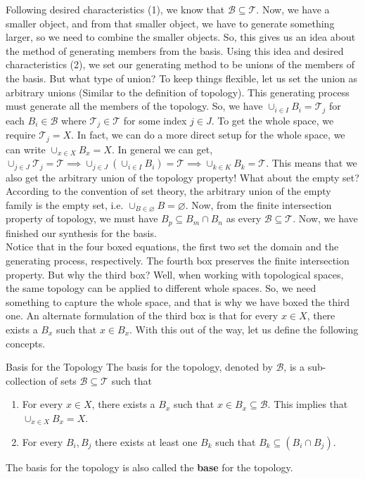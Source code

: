 Following desired characteristics (1), we know that $\boxed{\mathcal{B}\subseteq\mathcal{T}}$. Now, we have a smaller object, and from that smaller object, we have to generate something larger, so we need to combine the smaller objects. So, this gives us an idea about the method of generating members from the basis. Using this idea and desired characteristics (2), we set our generating method to be unions of the members of the basis. But what type of union? To keep things flexible, let us set the union as arbitrary unions (Similar to the definition of topology). This generating process must generate all the members of the topology. So, we have $\boxed{\cup_{i\in I}B_i=\mathcal{T}_j}$ for each $B_i\in\mathcal{B}$ where $\mathcal{T}_j\in\mathcal{T}$ for some index $j\in J$. To get the whole space, we require $\mathcal{T}_j=X$. In fact, we can do a more direct setup for the whole space, we can write $\boxed{\cup_{x\in X}B_x=X}$. In general we can get, $\cup_{j\in J}\mathcal{T}_j=\mathcal{T}\implies\cup_{j\in J}(\cup_{i\in I}B_i)=\mathcal{T}\implies\cup_{k\in K}B_k=\mathcal{T}$. This means that we also get the arbitrary union of the topology property! What about the empty set? According to the convention of set theory, the arbitrary union of the empty family is the empty set, i.e. $\cup_{B\in\varnothing}B=\varnothing$. Now, from the finite intersection property of topology, we must have $\boxed{B_p\subseteq B_m\cap B_n}$ as every $\mathcal{B}\subseteq\mathcal{T}$. Now, we have finished our synthesis for the basis.\\
Notice that in the four boxed equations, the first two set the domain and the generating process, respectively. The fourth box preserves the finite intersection property. But why the third box? Well, when working with topological spaces, the same topology can be applied to different whole spaces. So, we need something to capture the whole space, and that is why we have boxed the third one. An alternate formulation of the third box is that for every $x\in X$, there exists a $B_x$ such that $x\in B_x$. With this out of the way, let us define the following concepts.
\begin{Definition}{Basis for the Topology}\label{basis_topology}
    The basis for the topology, denoted by $\mathcal{B}$, is a sub-collection of sets $\mathcal{B}\subseteq\mathcal{T}$ such that
    \begin{enumerate}
        \item For every $x\in X$, there exists a $B_x$ such that $x\in B_x\subseteq\mathcal{B}$. This implies that $\cup_{x\in X}B_x=X$.
        \item For every $B_i, B_j$ there exists at least one $B_k$ such that $B_k\subseteq(B_i\cap B_j)$.
    \end{enumerate}
    The basis for the topology is also called the \textbf{base} for the topology.
\end{Definition}
